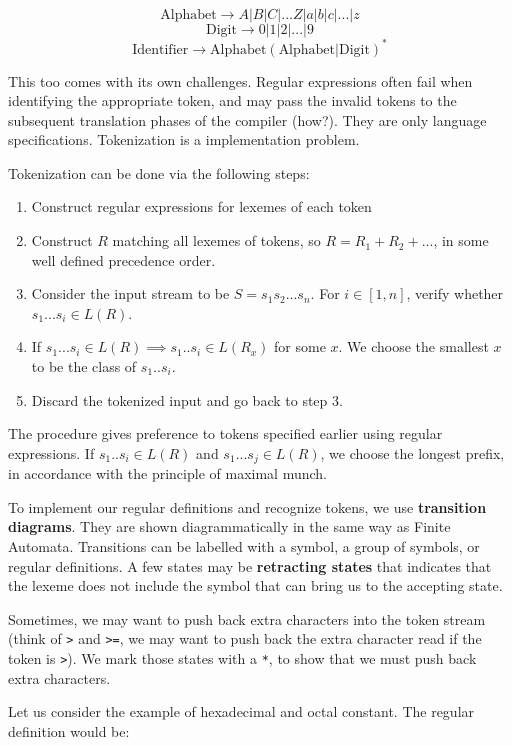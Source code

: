 \documentclass[12pt,letterpaper]{amsbook}
\theoremstyle{definition}
\begin{document}
\[\text{Alphabet} \rightarrow A|B|C|...Z|a|b|c|...|z\]
\[\text{Digit} \rightarrow 0|1|2|...|9\]
\[\text{Identifier} \rightarrow \text{Alphabet}(\text{Alphabet} | \text{Digit})^*\]

This too comes with its own challenges. Regular expressions often fail when identifying the appropriate token, and may pass the invalid tokens to the subsequent translation phases of the compiler (how?). They are only language specifications. Tokenization is a implementation problem.

Tokenization can be done via the following steps:

\begin{enumerate}
  \item Construct regular expressions for lexemes of each token
  \item Construct $R$ matching all lexemes of tokens, so $R = R_1+R_2+...$, in some well defined precedence order.
  \item Consider the input stream to be $S=s_1s_2...s_n$. For $i \in [1,n]$, verify whether $s_1...s_i \in L(R)$.
  \item If $s_1...s_i \in L(R) \implies s_1..s_i \in L(R_x)$ for some $x$. We choose the smallest $x$ to be the class of $s_1..s_i$. 
  \item Discard the tokenized input and go back to step 3.
\end{enumerate}

The procedure gives preference to tokens specified earlier using regular expressions. If $s_1..s_i \in L(R)$ and $s_1...s_j \in L(R)$, we choose the longest prefix, in accordance with the principle of maximal munch.

To implement our regular definitions and recognize tokens, we use \textbf{transition diagrams}. They are shown diagrammatically in the same way as Finite Automata. Transitions can be labelled with a symbol, a group of symbols, or regular definitions. A few states may be \textbf{retracting states} that indicates that the lexeme does not include the symbol that can bring us to the accepting state.

Sometimes, we may want to push back extra characters into the token stream (think of \texttt{>} and \texttt{>=}, we may want to push back the extra character read if the token is \texttt{>}). We mark those states with a \texttt{*}, to show that we must push back extra characters.

Let us consider the example of hexadecimal and octal constant. The regular definition would be:
\end{document}
